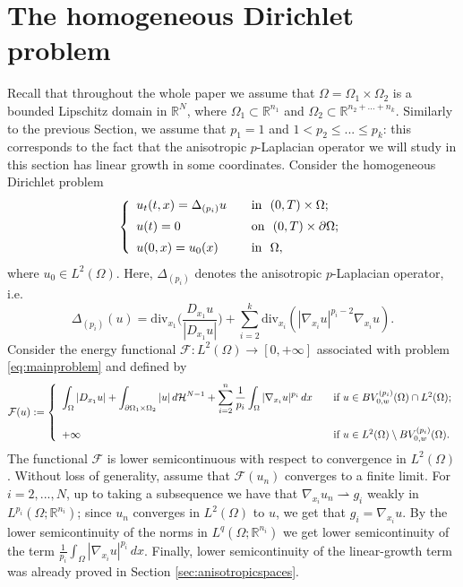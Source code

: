 \documentclass[reqno,12pt]{amsart}
\def\R{\mathbb R}
\numberwithin{equation}{section}
\begin{document}
\section{The homogeneous Dirichlet problem}\label{sec:dirichlet}

Recall that throughout the whole paper we assume that $\Omega = \Omega_1 \times \Omega_2$ is a bounded Lipschitz domain in $\mathbb{R}^N$, where $\Omega_1 \subset \R^{n_1}$ and $\Omega_2 \subset \R^{n_2+...+n_k}$. Similarly to the previous Section, we assume that $p_1 = 1$ and $1 < p_2 \leq ... \leq p_k$: this corresponds to the fact that the anisotropic $p$-Laplacian operator we will study in this section has linear growth in some coordinates. Consider the homogeneous Dirichlet problem
\begin{equation}\label{eq:mainproblem}
\left\{ \begin{array}{lll} u_t (t,x) = \Delta_{(p_i)} u   \quad &\hbox{in} \ \ (0, T) \times \Omega; \\[5pt] u(t) = 0 \quad &\hbox{on} \ \ (0, T) \times  \partial\Omega; \\[5pt] u(0,x) = u_0(x) \quad & \hbox{in} \ \  \Omega, \end{array} \right.
\end{equation}
where $u_0 \in L^2(\Omega)$. Here, $\Delta_{(p_i)}$ denotes the anisotropic $p$-Laplacian operator, i.e.
\begin{equation}
\Delta_{(p_i)}(u) = \mathrm{div}_{x_1} \bigg( \frac{D_{x_1} u}{|D_{x_1} u|} \bigg) + \sum_{i = 2}^k \mathrm{div}_{x_i} (|\nabla_{x_i} u|^{p_i - 2} \nabla_{x_i} u).
\end{equation}
Consider the energy functional $\mathcal{F} : L^2(\Omega) \rightarrow [0, + \infty]$ associated with problem \eqref{eq:mainproblem} and defined by
\begin{equation}
\mathcal{F}(u):= \left\{ \begin{array}{ll} \displaystyle\int_\Omega |D_{x_1} u| + \int_{\partial\Omega_1 \times \Omega_2} |u| \, d\mathcal{H}^{N-1} + \sum_{i=2}^n \frac{1}{p_i} \int_\Omega |\nabla_{x_i} u|^{p_i} \, dx \quad &\hbox{if} \ u \in BV_{0,w}^{(p_i)}(\Omega) \cap L^2(\Omega); \\ \\ + \infty \quad &\hbox{if} \ u \in  L^2(\Omega) \setminus BV_{0,w}^{(p_i)}(\Omega).
\end{array}\right.
\end{equation}
The functional $\mathcal{F}$ is lower semicontinuous with respect to convergence in $L^2(\Omega)$. Without loss of generality, assume that $\mathcal{F}(u_n)$ converges to a finite limit. For $i = 2, ..., N$, up to taking a subsequence we have that $\nabla_{x_i} u_n \rightharpoonup g_i$ weakly in $L^{p_i}(\Omega; \mathbb{R}^{n_i})$; since $u_n$ converges in $L^2(\Omega)$ to $u$, we get that $g_i = \nabla_{x_i} u$. By the lower semicontinuity of the norms in $L^q(\Omega; \mathbb{R}^{n_i})$ we get lower semicontinuity of the term $\frac{1}{p_i} \int_\Omega |\nabla_{x_i} u|^{p_i} \, dx$. Finally, lower semicontinuity of the linear-growth term was already proved in Section \ref{sec:anisotropicspaces}.
\end{document}
